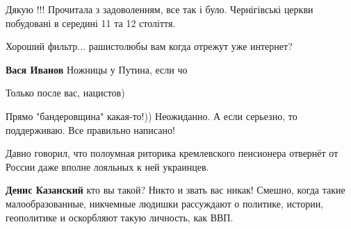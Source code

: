 \begin{itemize}
Дякую !!! Прочитала з задоволенням, все так і було. Чернігівські церкви побудовані в середині 11 та 12 століття.

 
Хороший фильтр... рашистолюбы вам когда отрежут уже интернет?

\begin{itemize}
 
\textbf{Вася Иванов} Ножницы у Путина, если чо

 
Только после вас, нацистов)
\end{itemize}

 
Прямо "бандеровщина" какая-то!)) Неожиданно.
А если серьезно, то поддерживаю. Все правильно написано!

 

Давно говорил, что полоумная риторика кремлевского пенсионера отвернёт от России даже вполне лояльных к ней украинцев.

\begin{itemize}
 
\textbf{Денис Казанский} кто вы такой? Никто и звать вас никак! Смешно, когда такие малообразованные, никчемные людишки рассуждают о политике, истории, геополитике и оскорбляют такую личность, как ВВП.


\end{itemize}
\end{itemize}
